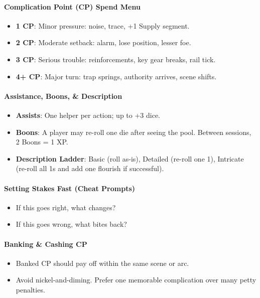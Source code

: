 \documentclass[11pt]{article}
\begin{document}
\paragraph{Complication Point (CP) Spend Menu}
\begin{itemize}
    \item \textbf{1 CP}: Minor pressure: noise, trace, +1 Supply segment.
    \item \textbf{2 CP}: Moderate setback: alarm, lose position, lesser foe.
    \item \textbf{3 CP}: Serious trouble: reinforcements, key gear breaks, rail tick.
    \item \textbf{4+ CP}: Major turn: trap springs, authority arrives, scene shifts.
\end{itemize}

\paragraph{Assistance, Boons, \& Description}
\begin{itemize}
    \item \textbf{Assists}: One helper per action; up to +3 dice.
    \item \textbf{Boons}: A player may re-roll one die after seeing the pool. Between sessions, 2 Boons = 1 XP.
    \item \textbf{Description Ladder}: Basic (roll as-is), Detailed (re-roll one 1), Intricate (re-roll all 1s and add one flourish if successful).
\end{itemize}

\paragraph{Setting Stakes Fast (Cheat Prompts)}
\begin{itemize}
    \item If this goes right, what changes?
    \item If this goes wrong, what bites back?
\end{itemize}

\paragraph{Banking \& Cashing CP}
\begin{itemize}
    \item Banked CP should pay off within the same scene or arc.
    \item Avoid nickel-and-diming. Prefer one memorable complication over many petty penalties.
\end{itemize}
\end{document}
